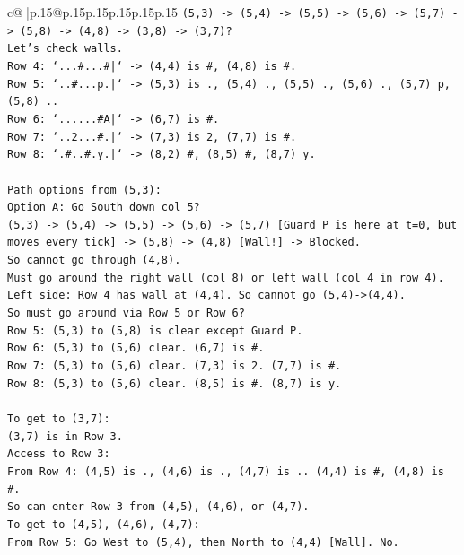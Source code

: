 \documentclass{article}
\begin{document}
{\begin{supertabular}{c@{$\;$}|p{.15\linewidth}@{}p{.15\linewidth}p{.15\linewidth}p{.15\linewidth}p{.15\linewidth}p{.15\linewidth}}
{{{\texttt{(5,3) {-}> (5,4) {-}> (5,5) {-}> (5,6) {-}> (5,7) {-}> (5,8) {-}> (4,8) {-}> (3,8) {-}> (3,7)?} \\
\texttt{Let's check walls.} \\
\texttt{Row 4: `...\#...\#|` {-}> (4,4) is \#, (4,8) is \#.} \\
\texttt{Row 5: `..\#...p.|` {-}> (5,3) is ., (5,4) ., (5,5) ., (5,6) ., (5,7) p, (5,8) ..} \\
\texttt{Row 6: `......\#A|` {-}> (6,7) is \#.} \\
\texttt{Row 7: `..2...\#.|` {-}> (7,3) is 2, (7,7) is \#.} \\
\texttt{Row 8: `.\#..\#.y.|` {-}> (8,2) \#, (8,5) \#, (8,7) y.} \\
\\ 
\texttt{Path options from (5,3):} \\
\texttt{Option A: Go South down col 5?} \\
\texttt{(5,3) {-}> (5,4) {-}> (5,5) {-}> (5,6) {-}> (5,7) {[}Guard P is here at t=0, but moves every tick{]} {-}> (5,8) {-}> (4,8) {[}Wall!{]} {-}> Blocked.} \\
\texttt{So cannot go through (4,8).} \\
\texttt{Must go around the right wall (col 8) or left wall (col 4 in row 4).} \\
\texttt{Left side: Row 4 has wall at (4,4). So cannot go (5,4){-}>(4,4).} \\
\texttt{So must go around via Row 5 or Row 6?} \\
\texttt{Row 5: (5,3) to (5,8) is clear except Guard P.} \\
\texttt{Row 6: (5,3) to (5,6) clear. (6,7) is \#.} \\
\texttt{Row 7: (5,3) to (5,6) clear. (7,3) is 2. (7,7) is \#.} \\
\texttt{Row 8: (5,3) to (5,6) clear. (8,5) is \#. (8,7) is y.} \\
\\ 
\texttt{To get to (3,7):} \\
\texttt{(3,7) is in Row 3.} \\
\texttt{Access to Row 3:} \\
\texttt{From Row 4: (4,5) is ., (4,6) is ., (4,7) is .. (4,4) is \#, (4,8) is \#.} \\
\texttt{So can enter Row 3 from (4,5), (4,6), or (4,7).} \\
\texttt{To get to (4,5), (4,6), (4,7):} \\
\texttt{From Row 5: Go West to (5,4), then North to (4,4) {[}Wall{]}. No.} \\
}}}
\end{supertabular}}
\end{document}
